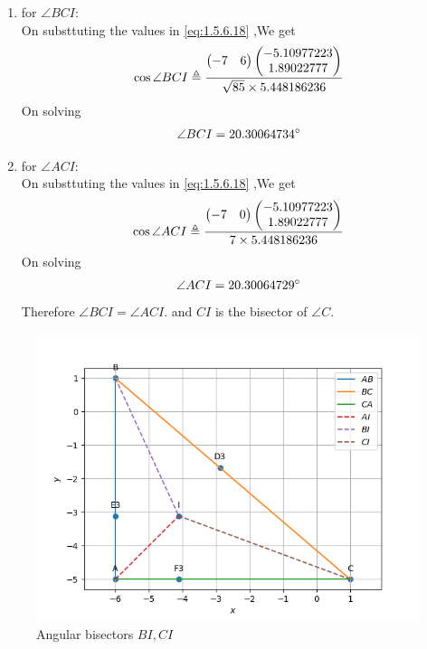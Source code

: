 \documentclass[11pt]{book}
\begin{document}
\begin{enumerate}[label=\thesection.\arabic*.,ref=\thesection.\theenumi]
\begin{enumerate}
\begin{enumerate}
    \item for $\angle BCI$: \\
    On substtuting the values in  \eqref{eq:1.5.6.18} ,We get 
    \begin{align}
        \cos{\angle BCI} \triangleq \frac{\begin{pmatrix} -7 & 6\end{pmatrix}\begin{pmatrix}-5.10977223 \\ 1.89022777\end{pmatrix}}{ \sqrt{85}\times 5.448186236} \\
    \end{align}
    On solving 
    \begin{align}
        \angle BCI = 20.30064734 \degree
    \end{align}
       \item for $\angle ACI$: \\
    On substtuting the values in  \eqref{eq:1.5.6.18} ,We get 
    \begin{align}
        \cos{\angle ACI} \triangleq \frac{\begin{pmatrix} -7 & 0\end{pmatrix}\begin{pmatrix}-5.10977223 \\ 1.89022777\end{pmatrix}}{ 7 \times 5.448186236} \\
    \end{align}
    On solving 
    \begin{align}
        \angle ACI = 20.30064729 \degree
    \end{align}
    Therefore $\angle BCI = \angle ACI.$ and $CI$ is the bisector of $\angle C$. 
\end{enumerate}
\begin{figure}[H]
\includegraphics[width=\columnwidth]{figs/BI_CI.png}
\caption{Angular bisectors  $BI, CI$}
\label{fig:fig5}
\end{figure}
\end{enumerate}

\end{enumerate}
\end{document}

